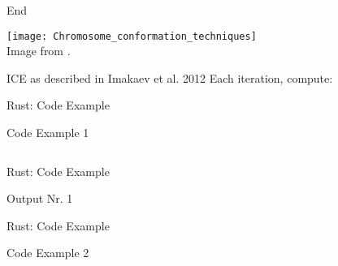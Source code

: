 
\begin{frame}[standout]
    \Huge
    End
\end{frame}

\appendix
\backupbegin


\begin{frame}[c]%
    \normalsize
    \texttt{[image: Chromosome\_conformation\_techniques]} \\
    Image from \cite{Li2014}.
\end{frame}

\begin{frame}[c]{ICE as described in Imakaev et al. 2012 \cite{imakaev2012iterative}}
    \Large
    Each iteration, compute:
    \pause
    \vspace*{-\baselineskip}
\end{frame}



\begin{frame}[c]{Rust: Code Example}
    \begin{codeboxed}{Code Example 1}
    \inputminted[linenos, fontsize=\normalsize]{Rust}{code/code_ownership.rs}
    \end{codeboxed}
\end{frame}

\begin{frame}[c]{Rust: Code Example}
    \begin{codeboxed}{Output Nr. 1}
        \footnotesize
        
    \end{codeboxed}
\end{frame}

\begin{frame}[c]{Rust: Code Example}
    \begin{codeboxed}{Code Example 2}
    \inputminted[linenos, fontsize=\normalsize]{Rust}{code/code_ownership2.rs}
    \end{codeboxed}
\end{frame}

